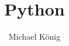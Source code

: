 \documentclass[11pt, a4paper]{article}
\title {Python}
\author {Michael König}
\date{}
\begin{document}
\begin{titlingpage}
  \maketitle
  \thispagestyle{firstpage}
  
  \begin{abstract}
  \noindent
  \end{abstract}
  \end{titlingpage}


\newpage
\tableofcontents
\newpage
\pagestyle{content}
\setcounter{page}{1}

\end{document}
